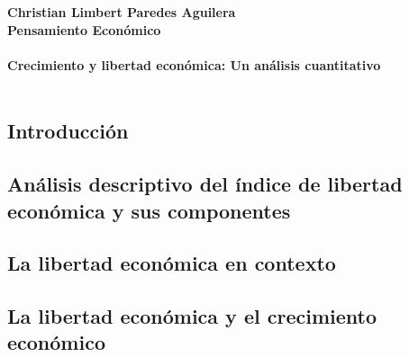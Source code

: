 \textbf{Christian Limbert Paredes Aguilera}\\
\textbf{Pensamiento Económico}\\\\
\center\textbf{\Large Crecimiento y libertad económica: Un análisis cuantitativo}\\\\
\vspace{1cm}

\begin{multicols}{2}
    \subsection*{Introducción}
    \subsection*{Análisis descriptivo del índice de libertad económica y sus componentes}
    \subsection*{La libertad económica en contexto}
    \subsection*{La libertad económica y el crecimiento económico}
\end{multicols}
